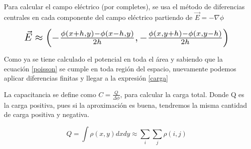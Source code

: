\vspace{\baselineskip}

\begin{comment}

\begin{equation}
\label{aproxV}
\resizebox{.9\columnwidth }{!}{
$\phi(x,y) \approx \frac{(16 \phi(x - 1,y)
                        + 16 \phi(x,y - 1)
                        + 16 \phi(x + 1,y)
                        + 16 \phi(x,y + 1)
                        - \phi(x - 2,y)
                        -  \phi(x,y - 2)
                        - \phi(x + 2,y)
                        - \phi(x,y + 2)
                        }{60}$
}
\end{equation}




\begin{equation}

     \phi(x,y) \approx \frac{(16 \phi(x - 1,y)
                        + 16 \phi(x,y - 1)
                        + 16 \phi(x + 1,y)
                        + 16 \phi(x,y + 1)
                        - \phi(x - 2,y)
                        -  \phi(x,y - 2)
                        - \phi(x + 2,y)
                        - \phi(x,y + 2)
                        }{60}
\end{equation} 
\end{comment}



Para calcular el campo eléctrico (por completes), se usa el método de diferencias centrales en cada componente del campo eléctrico partiendo de $\vec{E}=-\nabla \phi$

\begin{equation}
\label{E}
\resizebox{.9\columnwidth }{!}{
$\vec{E} \approx \left( -\frac{\phi(x+h,y)-\phi(x-h,y)}{2h},-\frac{\phi(x,y+h)-\phi(x,y-h)}{2h}\right) $
}
\end{equation}



Como ya se tiene calculado el potencial en toda el área y sabiendo que la ecuación \ref{poisson} se cumple en toda región del espacio, nuevamente podemos aplicar diferencias finitas y llegar a la expresión \ref{carga}

\begin{comment}
   \begin{equation}
\label{carga}
 -\frac{\rho(x,y)}{\epsilon_0} \approx \frac{\phi(x+h,y)+\phi(x-h,z)+\phi(x,y+h)+\phi(x,y-h)-4\phi(x,y)}{h^2}
\end{equation}  
\end{comment}

La capacitancia se define como $C=\frac{Q}{\Delta \phi}$, para calcular la carga total. Donde Q es la carga positiva, pues si la aproximación es buena, tendremos la misma cantidad de carga positiva y negativa. 

\begin{equation}
    \label{cargatotal}
    Q = \int \rho(x,y) dxdy \approx \sum_i \sum_j \rho(i,j) 
\end{equation}